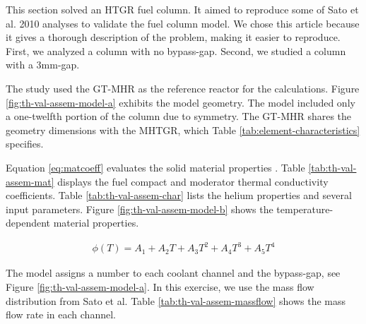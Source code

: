 This section solved an HTGR fuel column.
It aimed to reproduce some of Sato et al. 2010 \cite{sato_computational_2010} analyses to validate the fuel column model.
We chose this article because it gives a thorough description of the problem, making it easier to reproduce.
First, we analyzed a column with no bypass-gap.
Second, we studied a column with a 3mm-gap.

The study used the GT-MHR as the reference reactor for the calculations.
Figure \ref{fig:th-val-assem-model-a} exhibits the model geometry.
The model included only a one-twelfth portion of the column due to symmetry.
The GT-MHR shares the geometry dimensions with the MHTGR, which Table \ref{tab:element-characteristics} specifies.

Equation \ref{eq:matcoeff} evaluates the solid material properties \cite{johnson_cfd_2009}.
Table \ref{tab:th-val-assem-mat} displays the fuel compact and moderator thermal conductivity coefficients.
Table \ref{tab:th-val-assem-char} lists the helium properties and several input parameters.
Figure \ref{fig:th-val-assem-model-b} shows the temperature-dependent material properties.

\begin{align}
  \phi(T) = A_1 + A_2 T + A_3 T^2 + A_4 T^3 + A_5 T^4  \label{eq:matcoeff}
\end{align}

The model assigns a number to each coolant channel and the bypass-gap, see Figure \ref{fig:th-val-assem-model-a}.
In this exercise, we use the mass flow distribution from Sato et al.
Table \ref{tab:th-val-assem-massflow} shows the mass flow rate in each channel.

